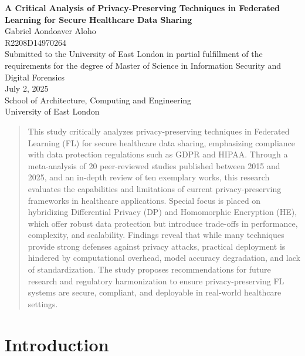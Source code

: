 \documentclass[12pt]{report}
\begin{document}
\begin{titlepage}
    \centering
    \vspace*{1cm}
    {\LARGE \textbf{A Critical Analysis of Privacy-Preserving Techniques in Federated Learning for Secure Healthcare Data Sharing}} \\[1cm]
    {\large Gabriel Aondoaver Aloho} \\[0.5cm]
    {\large R2208D14970264} \\[0.5cm]
    {\large Submitted to the University of East London in partial fulfillment of the requirements for the degree of Master of Science in Information Security and Digital Forensics} \\[1cm]
    {\large July 2, 2025} \\[0.5cm]
    {\large School of Architecture, Computing and Engineering} \\[0.5cm]
    {\large University of East London}
\end{titlepage}

\tableofcontents
\listoftables
\clearpage

\onehalfspacing

\begin{abstract}
This study critically analyzes privacy-preserving techniques in Federated Learning (FL) for secure healthcare data sharing, emphasizing compliance with data protection regulations such as GDPR and HIPAA. Through a meta-analysis of 20 peer-reviewed studies published between 2015 and 2025, and an in-depth review of ten exemplary works, this research evaluates the capabilities and limitations of current privacy-preserving frameworks in healthcare applications. Special focus is placed on hybridizing Differential Privacy (DP) and Homomorphic Encryption (HE), which offer robust data protection but introduce trade-offs in performance, complexity, and scalability. Findings reveal that while many techniques provide strong defenses against privacy attacks, practical deployment is hindered by computational overhead, model accuracy degradation, and lack of standardization. The study proposes recommendations for future research and regulatory harmonization to ensure privacy-preserving FL systems are secure, compliant, and deployable in real-world healthcare settings.
\end{abstract}

\chapter{Introduction}
\end{document}

